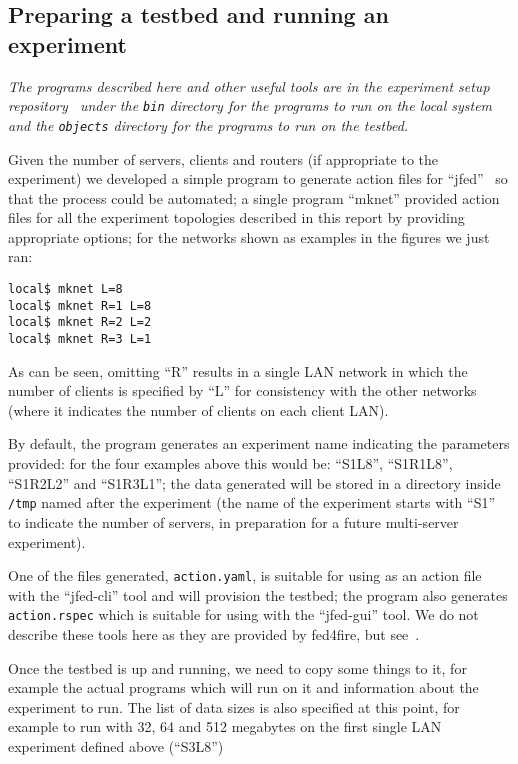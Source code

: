\documentclass[a4paper,12pt]{article}
\begin{document}
\subsection{Preparing a testbed and running an experiment}

{\em The programs described here and other useful tools are in the experiment
setup repository~\cite{exp:scripts} under the {\tt bin} directory for
the programs to run on the local system and the {\tt objects} directory
for the programs to run on the testbed.}

Given the number of servers, clients and routers (if appropriate to the
experiment) we developed a simple program to generate action files
for ``jfed''~\cite{jfed} so that the process could be automated; a single program
``mknet'' provided action files for all the experiment topologies
described in this report by providing appropriate options; for the
networks shown as examples in the figures we just ran:

\begin{verbatim}
local$ mknet L=8
local$ mknet R=1 L=8
local$ mknet R=2 L=2
local$ mknet R=3 L=1
\end{verbatim}

As can be seen, omitting ``R'' results in a single LAN network in which
the number of clients is specified by ``L'' for consistency with the
other networks (where it indicates the number of clients on each client
LAN).

By default, the program generates an experiment name indicating the
parameters provided: for the four examples above this would be: ``S1L8'',
``S1R1L8'', ``S1R2L2'' and ``S1R3L1''; the data generated will be stored
in a directory inside {\tt/tmp} named after the experiment (the name
of the experiment starts with ``S1'' to indicate the number of servers,
in preparation for a future multi-server experiment).

One of the files generated, {\tt action.yaml}, is suitable for using as
an action file with the ``jfed-cli'' tool and will provision the testbed;
the program also generates {\tt action.rspec} which is suitable for
using with the ``jfed-gui'' tool.  We do not describe these tools here
as they are provided by fed4fire, but see~\cite{jfed}.

Once the testbed is up and running, we need to copy some things to it,
for example the actual programs which will run on it and information about
the experiment to run.  The list of data sizes is also specified at
this point, for example to run with 32, 64 and 512 megabytes on the
first single LAN experiment defined above (``S3L8'')
\end{document}
